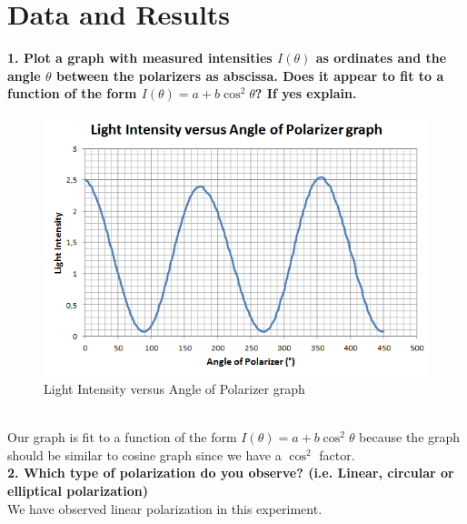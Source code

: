 \documentclass[a4paper,12pt]{report}
\begin{document}
\chapter{Data and Results}
\textbf{1. Plot a graph with measured intensities $I(\theta)$ as ordinates and the angle $\theta$ between the polarizers as abscissa. Does it appear to fit to a function of the form $I(\theta)=a+b\cos^{2}\theta$? If yes explain.}
\begin{figure}[h]
\centering
\includegraphics[width=1.05\linewidth, height=0.5\textheight]{graph}
\caption{Light Intensity versus Angle of Polarizer graph}
\label{fig:graph}
\end{figure}
\\
Our graph is fit to a function of the form $I(\theta)=a+b\cos^{2}\theta$ because the graph should be similar to cosine graph since we have a $\cos^{2}$ factor.\\
\textbf{2. Which type of polarization do you observe? (i.e. Linear, circular or elliptical polarization)}\\
We have observed linear polarization in this experiment.
\end{document}
